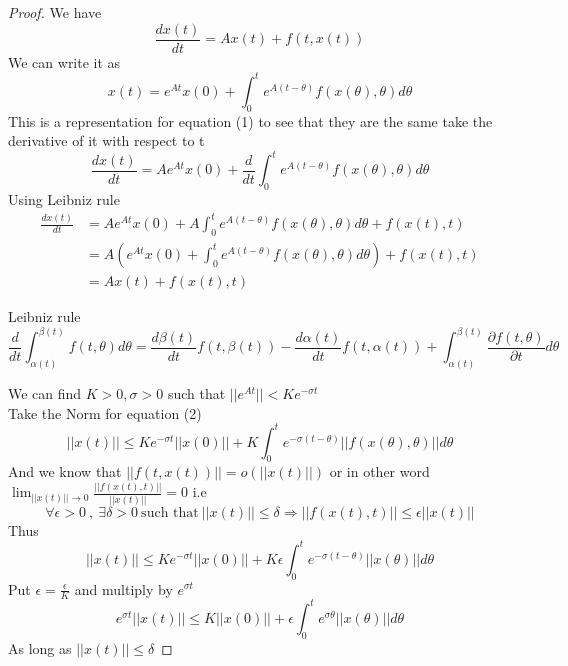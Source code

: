 \begin{proof}[\textcolor{theme}{Proof}]
    We have
    \begin{equation}
        \frac{dx(t)}{dt} = Ax(t) + f(t,x(t))
    \end{equation}
    We can write it as
    \begin{equation}
        x(t) = e^{At}x(0) + \int_{0}^{t} e^{A(t-\theta)} f(x(\theta),\theta) d \theta
    \end{equation}
    This is a representation for equation (1) to see that they are the same take the derivative of it with respect to t
    \[
        \frac{dx(t)}{dt} = A e^{At}x(0) + \frac{d}{dt} \int_{0}^{t} e^{A(t-\theta)} f(x(\theta),\theta) d \theta
    \]
    Using Leibniz rule
    \begin{align*}
        \frac{dx(t)}{dt} & = A e^{At}x(0) + A\int_{0}^{t} e^{A(t-\theta)} f(x(\theta),\theta) d \theta + f(x(t),t)
        \\
                         & =A\left(e^{At}x(0) + \int_{0}^{t} e^{A(t-\theta)} f(x(\theta),\theta) d \theta \right) + f(x(t),t)
        \\
                         & = Ax(t) + f(x(t),t)
    \end{align*}
    \begin{enrichment*}{Leibniz rule}
        \[
            \frac{d}{dt}\int_{\alpha(t)}^{\beta(t)} f(t,\theta)d\theta = \frac{d\beta(t)}{dt}f(t,\beta(t))-\frac{d\alpha(t)}{dt}f(t,\alpha(t)) + \int_{\alpha(t)}^{\beta(t)} \frac{\partial f(t,\theta)}{\partial t} d\theta
        \]
    \end{enrichment*}
    We can find $K>0,\sigma>0$ such that $||e^{At}||<Ke^{-\sigma t}$
    \\
    Take the Norm for equation (2)
    \[
        ||x(t)|| \leq Ke^{-\sigma t}||x(0)|| + K\int_{0}^{t} e^{-\sigma(t-\theta)} ||f(x(\theta),\theta)|| d \theta
    \]
    And we know that $||f(t,x(t))|| = o(||x(t)||)$ or in other word
    $\displaystyle \lim_{||x(t)|| \to 0}\frac{||f(x(t),t)||}{||x(t)||} = 0$ i.e
    \[
        \forall \epsilon >0 \  , \ \exists \delta >0 \ \text{such that} \ || x(t)|| \leq \delta \Longrightarrow
        ||f(x(t),t)|| \leq \epsilon ||x(t)||
    \]
    Thus
    \[
        ||x(t)|| \leq Ke^{-\sigma t}||x(0)|| + K \epsilon \int_{0}^{t} e^{-\sigma(t-\theta)} ||x(\theta)|| d \theta
    \]
    Put $\displaystyle \epsilon = \frac{\epsilon}{K}$ and multiply by  $e^{\sigma t}$
    \[
        e^{\sigma t}||x(t)|| \leq K||x(0)|| + \epsilon \int_{0}^{t} e^{\sigma \theta} ||x(\theta)|| d \theta
    \]
    As long as $||x(t)|| \leq \delta$


\end{proof}
